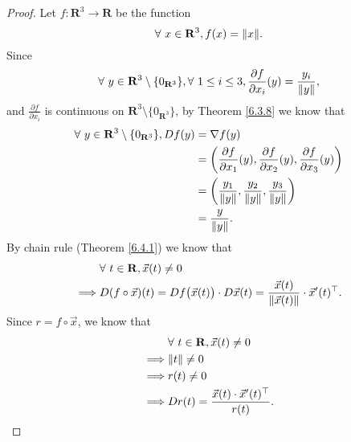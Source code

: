 \begin{proof}
    Let \(f : \mathbf{R}^3 \to \mathbf{R}\) be the function
    \[
        \forall\ x \in \mathbf{R}^3, f(x) = \norm*{x}.
    \]
    Since
    \[
        \forall\ y \in \mathbf{R}^3 \setminus \{0_{\mathbf{R}^3}\}, \forall\ 1 \leq i \leq 3, \frac{\partial f}{\partial x_i}(y) = \frac{y_i}{\norm*{y}},
    \]
    and \(\frac{\partial f}{\partial x_i}\) is continuous on \(\mathbf{R}^3 \setminus \{0_{\mathbf{R}^3}\}\), by Theorem \ref{6.3.8} we know that
    \begin{align*}
        \forall\ y \in \mathbf{R}^3 \setminus \{0_{\mathbf{R}^3}\}, D f(y) & = \nabla f(y)                                                                                                            \\
                                                                           & = \bigg(\frac{\partial f}{\partial x_1}(y), \frac{\partial f}{\partial x_2}(y), \frac{\partial f}{\partial x_3}(y)\bigg) \\
                                                                           & = \bigg(\frac{y_1}{\norm*{y}}, \frac{y_2}{\norm*{y}}, \frac{y_3}{\norm*{y}}\bigg)                                        \\
                                                                           & = \frac{y}{\norm*{y}}.
    \end{align*}
    By chain rule (Theorem \ref{6.4.1}) we know that
    \begin{align*}
                 & \forall\ t \in \mathbf{R}, \vec{x}(t) \neq 0                                                                                        \\
        \implies & D (f \circ \vec{x})(t) = D f\big(\vec{x}(t)\big) \cdot D \vec{x}(t) = \frac{\vec{x}(t)}{\norm*{\vec{x}(t)}} \cdot \vec{x}'(t)^\top.
    \end{align*}
    Since \(r = f \circ \vec{x}\), we know that
    \begin{align*}
                 & \forall\ t \in \mathbf{R}, \vec{x}(t) \neq 0             \\
        \implies & \norm*{t} \neq 0                                         \\
        \implies & r(t) \neq 0                                              \\
        \implies & D r(t) = \frac{\vec{x}(t) \cdot \vec{x}'(t)^\top}{r(t)}.
    \end{align*}
\end{proof}